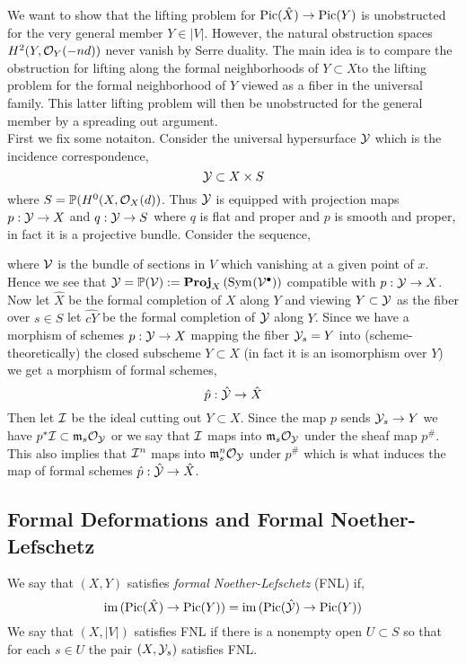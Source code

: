 \documentclass[12pt]{article}
\begin{document}
We want to show that the lifting problem for $\mathrm{Pic}(\hat{X}) \to \mathrm{Pic}(Y)$ is unobstructed for the very general member $Y \in |V|$. However, the natural obstruction spaces $H^2(Y, \mathcal{O}_{Y}(-nd))$ never vanish by Serre duality. The main idea is to compare the obstruction for lifting along the formal neighborhoods of $Y \subset X$to the lifting problem for the formal neighborhood of $Y$ viewed as a fiber in the universal family. This latter lifting problem will then be unobstructed for the general member by a spreading out argument. 
\bigskip\\
First we fix some notaiton. Consider the universal hypersurface $\mathcal{Y}$ which is the incidence correspondence,
\[ \mathcal{Y} \subset X \times S \]
where $S = \mathbb{P}(H^0(X, \mathcal{O}_{X}(d))$. Thus $\mathcal{Y}$ is equipped with projection maps $p : \mathcal{Y} \to X$ and $q : \mathcal{Y} \to S$ where $q$ is flat and proper and $p$ is smooth and proper, in fact it is a projective bundle. Consider the sequence,
\begin{center}
\end{center}
where $\mathcal{V}$ is the bundle of sections in $V$ which vanishing at a given point of $x$. Hence we see that $\mathcal{Y} = \mathbb{P}(\mathcal{V}) := \mathbf{Proj}_{X}\left( \mathrm{Sym}_{}\! \left( \mathcal{V}^\bullet \right) \right)$ compatible with $p : \mathcal{Y} \to X$. Now let $\hat{X}$ be the formal completion of $X$ along $Y$ and viewing $Y \subset \mathcal{Y}$ as the fiber over $s \in S$ let $\hat{cY}$ be the formal completion of $\mathcal{Y}$ along $Y$. Since we have a morphism of schemes $p : \mathcal{Y} \to X$ mapping the fiber $\mathcal{Y}_s = Y$ into (scheme-theoretically) the closed subscheme $Y \subset X$ (in fact it is an isomorphism over $Y$) we get a morphism of formal schemes,
\[ \hat{p} : \hat{\mathcal{Y}} \to \hat{X} \]
Then let $\mathcal{I}$ be the ideal cutting out $Y \subset X$. Since the map $p$ sends $\mathcal{Y}_s \to Y$ we have $p^* \mathcal{I} \subset \mathfrak{m}_s \mathcal{O}_{\mathcal{Y}}$ or we say that $\mathcal{I}$ maps into $\mathfrak{m}_s \mathcal{O}_{\mathcal{Y}}$ under the sheaf map $p^{\#}$. This also implies that $\mathcal{I}^n$ maps into $\mathfrak{m}_s^n \mathcal{O}_{\mathcal{Y}}$ under $p^{\#}$ which is what induces the map of formal schemes $\hat{p} : \hat{\mathcal{Y}} \to \hat{X}$. 

\subsection{Formal Deformations and Formal Noether-Lefschetz}

\begin{defn}
We say that $(X, Y)$ satisfies \textit{formal Noether-Lefschetz} (FNL) if,
\[ \operatorname{\mathrm{im}}{(\mathrm{Pic}(\hat{X}) \to \mathrm{Pic}(Y))} = \operatorname{\mathrm{im}}{(\mathrm{Pic}(\hat{\mathcal{Y}}) \to \mathrm{Pic}(Y))} \]
We say that $(X, |V|)$ satisfies FNL if there is a nonempty open $U \subset S$ so that for each $s \in U$ the pair $(X, \mathcal{Y}_s)$ satisfies FNL.
\end{defn}
\end{document}
